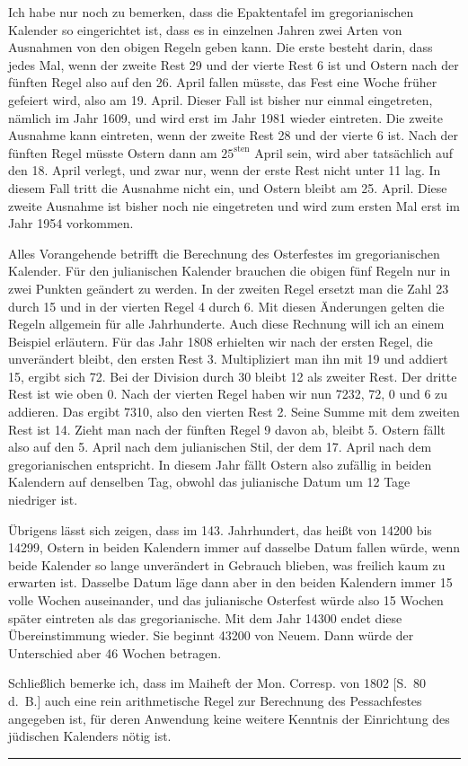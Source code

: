 Ich habe nur noch zu bemerken, dass die Epaktentafel im gregorianischen Kalender so eingerichtet ist, dass es in einzelnen Jahren zwei Arten von Ausnahmen von den obigen Regeln geben kann. Die erste besteht darin, dass jedes Mal, wenn der zweite Rest 29 und der vierte Rest 6 ist und Ostern nach der fünften Regel also auf den 26. April fallen müsste, das Fest eine Woche früher gefeiert wird, also am 19. April. Dieser Fall ist bisher nur einmal eingetreten, nämlich im Jahr 1609, und wird erst im Jahr 1981 wieder eintreten. Die zweite Ausnahme kann eintreten, wenn der zweite Rest 28 und der vierte 6 ist. Nach der fünften Regel müsste Ostern dann am $25^{\mathrm{sten}}$ April sein, wird aber tatsächlich auf den 18. April verlegt, und zwar nur, wenn der erste Rest nicht unter 11 lag. In diesem Fall tritt die Ausnahme nicht ein, und Ostern bleibt am 25. April. Diese zweite Ausnahme ist bisher noch nie eingetreten und wird zum ersten Mal erst im Jahr 1954 vorkommen.

Alles Vorangehende betrifft die Berechnung des Osterfestes im gregorianischen Kalender. Für den julianischen Kalender brauchen die obigen fünf Regeln nur in zwei Punkten geändert zu werden. In der zweiten Regel ersetzt man die Zahl 23 durch 15 und in der vierten Regel 4 durch 6. Mit diesen Änderungen gelten die Regeln allgemein für alle Jahrhunderte. Auch diese Rechnung will ich an einem Beispiel erläutern. Für das Jahr 1808 erhielten wir nach der ersten Regel, die unverändert bleibt, den ersten Rest 3. Multipliziert man ihn mit 19 und addiert 15, ergibt sich 72. Bei der Division durch 30 bleibt %
%
12 als zweiter Rest. Der dritte Rest ist wie oben 0. Nach der vierten Regel haben wir nun 7232, 72, 0 und 6 zu addieren. Das ergibt 7310, also den vierten Rest 2. Seine Summe mit dem zweiten Rest ist 14. Zieht man nach der fünften Regel 9 davon ab, bleibt 5. Ostern fällt also auf den 5. April nach dem julianischen Stil, der dem 17. April nach dem gregorianischen entspricht. In diesem Jahr fällt Ostern also zufällig in beiden Kalendern auf denselben Tag, obwohl das julianische Datum um 12 Tage niedriger ist.

Übrigens lässt sich zeigen, dass im 143. Jahrhundert, das heißt von 14200 bis 14299, Ostern in beiden Kalendern immer auf dasselbe Datum fallen würde, wenn beide Kalender so lange unverändert in Gebrauch blieben, was freilich kaum zu erwarten ist. Dasselbe Datum läge dann aber in den beiden Kalendern immer 15 volle Wochen auseinander, und das julianische Osterfest würde also 15 Wochen später eintreten als das gregorianische. Mit dem Jahr 14300 endet diese Übereinstimmung wieder. Sie beginnt 43200 von Neuem. Dann würde der Unterschied aber 46 Wochen betragen.

Schließlich bemerke ich, dass im Maiheft der Mon. Corresp. von 1802 [S.~80 d.~B.] auch eine rein arithmetische Regel zur Berechnung des Pessachfestes angegeben ist, für deren Anwendung keine weitere Kenntnis der Einrichtung des jüdischen Kalenders nötig ist.

\begin{center}\rule{.25\linewidth}{.3pt}\end{center}
